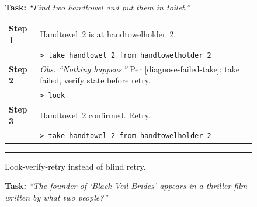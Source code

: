 \documentclass{article}
\theoremstyle{plain}
\theoremstyle{definition}
\theoremstyle{remark}
\begin{document}
\begin{figure}[!t]
\centering
\begin{minipage}[t]{0.44\textwidth}
\begin{tcolorbox}[
    colback=white, colframe=black!40, sharp corners,
    boxrule=0.6pt, left=4pt, right=4pt, top=3pt, bottom=3pt,
    title={\small\textbf{ALFWorld}},
    fonttitle=\sffamily\scriptsize, colbacktitle=black!5, coltitle=black,
    equal height group=casepanels
]
\scriptsize
\textbf{Task:} \textit{``Find two handtowel and put them in toilet.''}
\vspace{2pt}

\begin{tabularx}{\linewidth}{@{}p{0.7cm} X@{}}
    \textbf{Step 1} & Handtowel~2 is at handtowelholder~2. \\
    & \textcolor{black!55}{\texttt{> take handtowel 2 from handtowelholder 2}} \\
    \midrule
    \textbf{Step 2} & \textit{Obs: ``Nothing happens.''} Per [\textcolor{skillcolor}{diagnose-failed-take}]: take failed, verify state before retry. \\
    & \textcolor{black!55}{\texttt{> look}} \\
    \midrule
    \textbf{Step 3} & Handtowel~2 confirmed. Retry. \\
    & \textcolor{black!55}{\texttt{> take handtowel 2 from handtowelholder 2}} \\
\end{tabularx}

\vspace{2pt}\hrule\vspace{2pt}
\textbf{\textcolor{successgreen}{\scriptsize\checkmark}} {\scriptsize Look-verify-retry instead of blind retry.}
\end{tcolorbox}
\end{minipage}\hfill%
\begin{minipage}[t]{0.55\textwidth}
\begin{tcolorbox}[
    colback=white, colframe=black!40, sharp corners,
    boxrule=0.6pt, left=4pt, right=4pt, top=3pt, bottom=3pt,
    title={\small\textbf{Search}},
    fonttitle=\sffamily\scriptsize, colbacktitle=black!5, coltitle=black,
    equal height group=casepanels
]
\scriptsize
\textbf{Task:} \textit{``The founder of `Black Veil Brides' appears in a thriller film written by what two people?''}
\vspace{2pt}


\end{tcolorbox}
\end{minipage}
\end{figure}
\end{document}

